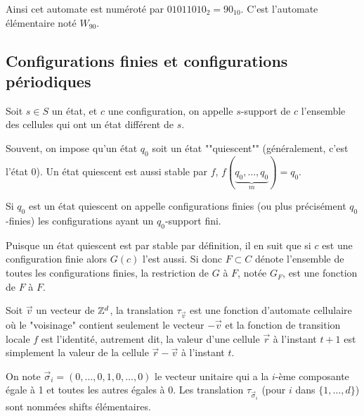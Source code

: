 	Ainsi cet automate est numéroté par $01011010_2 = 90_{10}$. C'est l'automate élémentaire noté $W_{90}$.

\subsection{Configurations finies et configurations périodiques}

\begin{definition}
	Soit $s \in S$ un état, et $c$ une configuration, on appelle $s$-support de $c$ l'ensemble des cellules qui ont
	un état différent de $s$.
\end{definition}

\begin{notation}
	Souvent, on impose qu'un état $q_0$ soit un état ""quiescent"" (généralement, c'est l'état 0). Un état quiescent est aussi stable par $f$, \ie $f(\underbrace{q_0,\ldots, q_0}_m) = q_0$.
\end{notation}

\begin{definition}
	 Si $q_0$ est un état quiescent on appelle configurations finies (ou plus précisément $q_0$-finies) les configurations ayant un $q_0$-support fini.
\end{definition}

Puisque un état quiescent est par stable par définition, il en suit que si $c$ est une configuration finie alors $G(c)$ l'est aussi. Si donc $F \subset C$ dénote l'ensemble de toutes les configurations finies, la restriction de $G$ à $F$, notée $G_F$, est une fonction de $F$ à $F$.

\begin{definition}
	Soit $\vec v$ un vecteur de $\mathbb{Z}^d$, la translation $\tau_{\vec v}$ est une fonction d'automate cellulaire où le "voisinage" contient seulement le vecteur $-\vec v$ et la fonction de transition locale  $f$ est l'identité,
	autrement dit, la valeur d'une cellule $\vec r$ à l'instant $t+1$ est simplement la valeur de la cellule $\vec r - \vec v$ à l'instant $t$.
\end{definition}

\begin{definition}
	On note $\vec \sigma_i = (0,\ldots,0, 1, 0, \ldots, 0)$  le vecteur unitaire qui a la $i$-ème composante égale à 1 et toutes les autres égales à 0. Les translation   $\tau_{\vec \sigma_i}$ (pour $i$ dans $\{1, \ldots, d\}$) sont nommées shifts élémentaires.
\end{definition}


